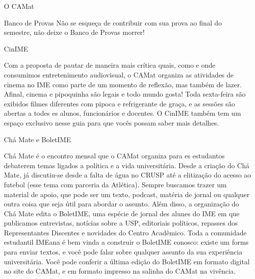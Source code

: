 \begin{secao}{O CAMat}
\begin{subsecao}{Banco de Provas}
Não se esqueça de contribuir com sua prova ao final do semestre, não
deixe o Banco de Provas morrer! 

\end{subsecao}




\begin{subsecao}{CinIME}

Com a proposta de pautar de maneira mais crítica quais, como e onde consumimos 
entretenimento audiovisual, o CAMat organiza as atividades de cinema no IME 
como parte de um momento de reflexão, mas também de lazer. Afinal, cinema e 
pipoquinha são legais e todo mundo gosta! Toda sexta-feira são exibidos filmes 
diferentes com pipoca e refrigerante de graça, e as sessões são abertas a todes 
es alunos, funcionários e docentes. O CinIME também tem um espaço exclusivo nesse
guia para que vocês possam saber mais detalhes.

\end{subsecao}

\begin{subsecao}{Chá Mate e BoletIME}

Chá Mate é o encontro mensal que o CAMat organiza para es estudantos debaterem temas
ligados a política e a vida universitária. Desde a criação do Chá Mate, já discutiu-se
desde a falta de água no CRUSP até a elitização do acesso ao futebol (esse tema com parceria
da Atlética). Sempre buscamos trazer um material de apoio, que pode ser um texto, podcast, matéria
de jornal ou qualquer outra coisa que seja útil para abordar o assunto. 
Além disso, a organização do Chá Mate edita o BoletIME, uma espécie de jornal des alunes do IME em
que publicamos entrevistas, notícias sobre a USP, editoriais políticos, repasses dos Representantes
Discentes e novidades do Centro Acadêmico. Toda a comunidade estudantil IMEana é bem vinda a construir
o BoletIME conosco: existe um forms para enviar textos, e você pode falar sobre qualquer assunto da sua
experiência universitária. Você pode conferir a última edição do BoletIME em formato 
digital no site do CAMat, e em formato impresso na salinha do CAMat na vivência.


\end{subsecao}
\end{secao}
